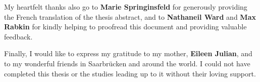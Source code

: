My heartfelt thanks also go to \textbf{Marie Springinsfeld} for generously providing the French translation of the thesis abstract, and to \textbf{Nathaneil Ward} and \textbf{Max Rabkin} for kindly helping to proofread this document and providing valuable feedback.

Finally, I would like to express my gratitude to 
my mother, \textbf{Eileen Julian}, and to {my wonderful friends} in Saarbrücken and around the world.
I could not have completed this thesis or the studies leading up to it without 
their loving support.
